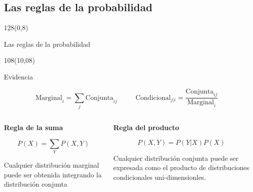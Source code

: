 \documentclass[shownotes]{beamer}
\begin{document}
\subsection{Las reglas de la probabilidad}

\begin{frame}
\begin{textblock}{128}(0,8)
\begin{center}
 \large Las reglas de la probabilidad
\end{center}
\end{textblock}
\begin{textblock}{108}(10,08)
 \begin{center}
  \Large  Evidencia
 \end{center}
\end{textblock}


\vspace{0.75cm}



\begin{equation*}
  \text{Marginal}_{i} = \sum_j \text{Conjunta}_{ij}  \ \ \ \ \ \ \ \ \ \ \ \  \text{Condicional}_{j|i} = \frac{\text{Conjunta}_{ij}}{\text{Marginal}_{i}}
\end{equation*}

\pause
\vspace{0.75cm}


\begin{columns}[t]
\begin{column}{0.5\textwidth}
 \centering \textbf{Regla de la suma}
 
 
\begin{equation*}
 P(X) = \sum_Y P(X,Y)
\end{equation*}
 
 \justifying \footnotesize
  Cualquier distribución marginal puede ser obtenida integrando la distribución conjunta

 \end{column}
 \begin{column}{0.5\textwidth}
\centering  \textbf{Regla del producto}

\begin{equation*}
 P(X,Y) = P(Y|X) P(X)
\end{equation*}

 \justifying \footnotesize
Cualquier distribución conjunta puede ser expresada como el producto de distribuciones condicionales uni-dimensionles.

\end{column}
\end{columns}

\end{frame}
\end{document}
